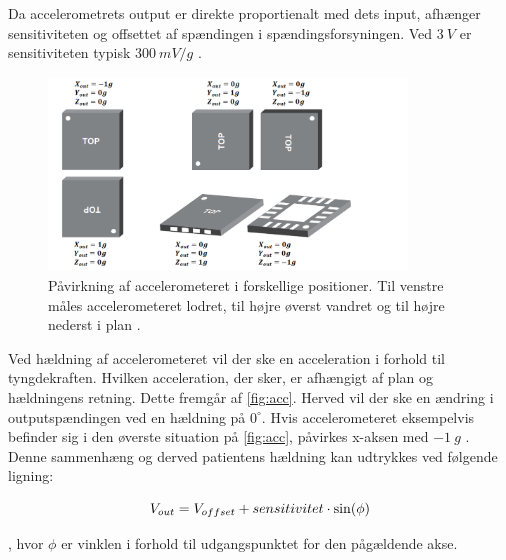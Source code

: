 Da accelerometrets output er direkte proportienalt med dets input, afhænger sensitiviteten og offsettet af spændingen i spændingsforsyningen. Ved $3~V$ er sensitiviteten typisk $300~mV/g$ \citep{analogdevices2010}. 


\begin{figure}[H]
\centering
\includegraphics[width=0.85\textwidth]{figures/acc_paavirkning}
\caption{Påvirkning af accelerometeret i forskellige positioner. Til venstre måles accelerometeret lodret, til højre øverst vandret og til højre nederst i plan \citep{analogdevices2010}.}
\label{fig:acc}
\end{figure}

\noindent
Ved hældning af accelerometeret vil der ske en acceleration i forhold til tyngdekraften. Hvilken acceleration, der sker, er afhængigt af plan og hældningens retning. Dette fremgår af \autoref{fig:acc}. Herved vil der ske en ændring i outputspændingen ved en hældning på $0^{\circ}$. Hvis accelerometeret eksempelvis befinder sig i den øverste situation på \autoref{fig:acc}, påvirkes x-aksen med $-1~g$ \citep{clifford2005}. Denne sammenhæng og derved patientens hældning kan udtrykkes ved følgende ligning: 

\begin{equation} \label{equ:vinkler}
	V_{out} = V_{offset} + sensitivitet \cdot \sin(\phi) \\
\end{equation}

\noindent
, hvor $\phi$ er vinklen i forhold til udgangspunktet for den pågældende akse\citep{clifford2005}.